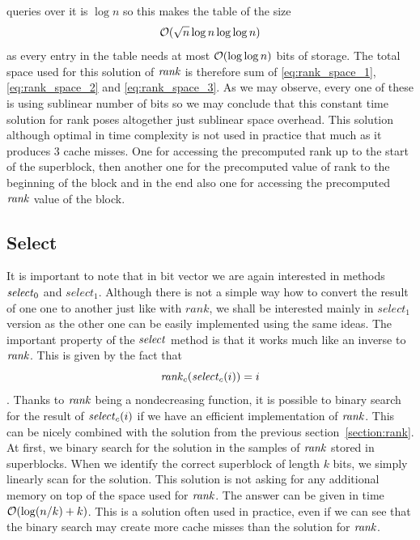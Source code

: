 queries over it is $\log n$ so this makes the table of the size
\begin{equation}
    \mathcal{O}(\sqrt{n}\log n\log\log n)
    \label{eq:rank_space_3}
\end{equation}
as every entry in the table needs at most $\mathcal{O}(\log\log n)$ bits of storage. The total space used for
this solution of $\mathit{rank}$ is therefore sum of \ref{eq:rank_space_1}, \ref{eq:rank_space_2} and
\ref{eq:rank_space_3}. As we may observe, every one of these is using sublinear number of bits so
we may conclude that this constant time solution for rank poses altogether just sublinear space overhead.
This solution although optimal in time complexity is not used in practice that much as it produces
3 cache misses. One for accessing the precomputed rank up to the start of the superblock, then
another one for the precomputed value of rank to the beginning of the block and in the end also one
for accessing the precomputed $\mathit{rank}$ value of the block.


\subsection{Select}
\label{section:select}

It is important to note that in bit vector we are again interested in methods $\mathit{select}_0$
and $select_1$. Although there is not a simple way how to convert the result of one one to
another just like with $rank$, we shall be interested mainly in $select_1$ version as the
other one can be easily implemented using the same ideas. The important property of the
$\mathit{select}$ method is that it works much like an inverse to $\mathit{rank}$. This is given by the fact that
$$\mathit{rank}_c(\mathit{select}_c(i)) = i$$. Thanks to $\mathit{rank}$ being a nondecreasing function, it is possible
to binary search for the result of $\mathit{select}_c(i)$ if we have an efficient implementation of
$\mathit{rank}$. This can be nicely combined with the solution from the previous section~\ref{section:rank}.
At first, we binary search for the solution in the samples of $\mathit{rank}$ stored in superblocks. When we
identify the correct superblock of length $k$ bits, we simply linearly scan for the solution. This
solution is not asking for any additional memory on top of the space used for $\mathit{rank}$. The answer
can be given in time $\mathcal{O}(\log(n/k)+k)$. This is a solution often used in practice, even if we
can see that the binary search may create more cache misses than the solution for $\mathit{rank}$.

